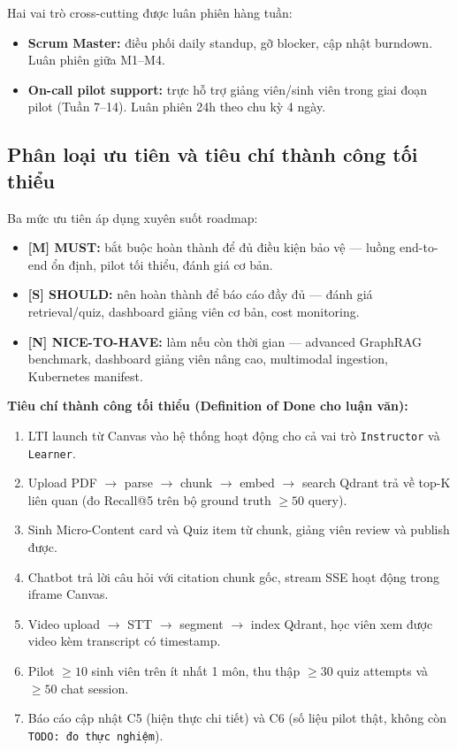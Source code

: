 Hai vai trò cross-cutting được luân phiên hàng tuần:
\begin{itemize}
    \item \textbf{Scrum Master:} điều phối daily standup, gỡ blocker,
          cập nhật burndown. Luân phiên giữa M1--M4.
    \item \textbf{On-call pilot support:} trực hỗ trợ giảng viên/sinh
          viên trong giai đoạn pilot (Tuần 7--14). Luân phiên 24h theo
          chu kỳ 4 ngày.
\end{itemize}

\subsection{Phân loại ưu tiên và tiêu chí thành công tối thiểu}
\label{subsec:priority-gd2}

Ba mức ưu tiên áp dụng xuyên suốt roadmap:
\begin{itemize}
    \item \textbf{[M] MUST:} bắt buộc hoàn thành để đủ điều kiện bảo vệ
          --- luồng end-to-end ổn định, pilot tối thiểu, đánh giá cơ
          bản.
    \item \textbf{[S] SHOULD:} nên hoàn thành để báo cáo đầy đủ ---
          đánh giá retrieval/quiz, dashboard giảng viên cơ bản, cost
          monitoring.
    \item \textbf{[N] NICE-TO-HAVE:} làm nếu còn thời gian --- advanced
          GraphRAG benchmark, dashboard giảng viên nâng cao, multimodal
          ingestion, Kubernetes manifest.
\end{itemize}

\textbf{Tiêu chí thành công tối thiểu (Definition of Done cho luận
văn):}
\begin{enumerate}
    \item LTI launch từ Canvas vào hệ thống hoạt động cho cả vai trò
          \texttt{Instructor} và \texttt{Learner}.
    \item Upload PDF $\to$ parse $\to$ chunk $\to$ embed $\to$ search
          Qdrant trả về top-K liên quan (đo Recall@5 trên bộ ground
          truth $\geq 50$ query).
    \item Sinh Micro-Content card và Quiz item từ chunk, giảng viên
          review và publish được.
    \item Chatbot trả lời câu hỏi với citation chunk gốc, stream SSE
          hoạt động trong iframe Canvas.
    \item Video upload $\to$ STT $\to$ segment $\to$ index Qdrant, học
          viên xem được video kèm transcript có timestamp.
    \item Pilot $\geq 10$ sinh viên trên ít nhất 1 môn, thu thập
          $\geq 30$ quiz attempts và $\geq 50$ chat session.
    \item Báo cáo cập nhật C5 (hiện thực chi tiết) và C6 (số liệu pilot
          thật, không còn \texttt{TODO: đo thực nghiệm}).
\end{enumerate}

